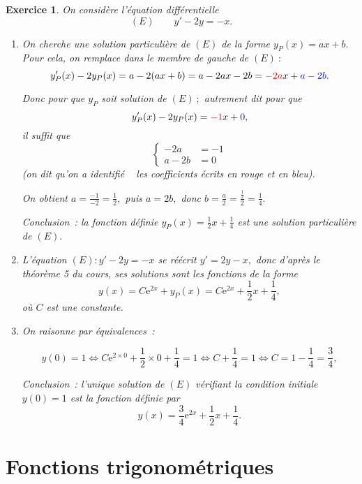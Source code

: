 \documentclass[10pt]{article}
\newtheorem{exo}{Exercice}
\begin{document}
\begin{exo}

On considère l'équation différentielle
\[(E)\qquad y'-2y=-x.\]

\begin{enumerate}
\item On cherche une solution particulière de $(E)$ de la forme $y_P(x)=ax+b.$ Pour cela, on remplace dans le membre de gauche de $(E)~:$
\[y_P'(x)-2y_P(x)=a-2(ax+b)=a-2ax-2b=\textcolor{red}{-2a}x+\textcolor{blue}{a-2b}.\]

Donc pour que $y_P$ soit solution de $(E)~;$ autrement dit pour que \[y_P'(x)-2y_P(x)=\textcolor{red}{-1}x+\textcolor{blue}{0},\]
il suffit que
\[\begin{cases}
-2a&=-1\\a-2b&=0\end{cases}\] (on dit qu'on a \og identifié \fg~{} les coefficients écrits en rouge et en bleu).

On obtient $a=\frac{-1}{-2}=\frac{1}{2},$ puis $a=2b,$ donc $b=\frac{a}{2}=\frac{\frac{1}{2}}{2}=\frac{1}{4}.$

\medskip

Conclusion~: la fonction définie $y_P(x)=\frac{1}{2}x+\frac{1}{4}$ est une solution particulière de $(E).$ 
\item L'équation $\left(E\right): y'-2y=-x$ se réécrit $y'=2y-x,$ donc d'après le théorème 5 du cours, ses solutions sont les fonctions de la forme 
\[y(x)=C\text{e}^{2x}+y_P(x)=C\text{e}^{2x}+\frac{1}{2}x+\frac{1}{4},\] où $C$ est une constante.
\item On raisonne par équivalences~:

\[y(0)=1\iff C\text{e}^{2\times 0}+\frac{1}{2}\times 0+\frac{1}{4}=1\iff C+\frac{1}{4}=1\iff C=1-\frac{1}{4}=\frac{3}{4},\]


Conclusion~: l'unique solution de $(E)$ vérifiant la condition initiale $y(0)=1$ est la fonction définie par
\[y(x)=\frac{3}{4}\text{e}^{2x}+\frac{1}{2}x+\frac{1}{4}.\]
\end{enumerate}
\end{exo}

\newpage

\section{Fonctions trigonométriques}
\end{document}
